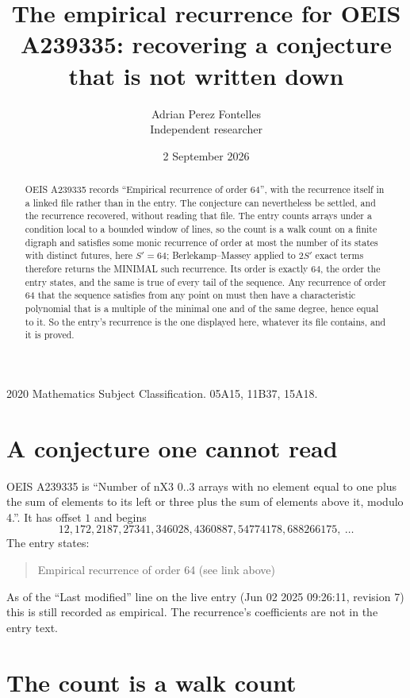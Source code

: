 \documentclass[11pt,a4paper]{article}
\title{The empirical recurrence for OEIS A239335: recovering a conjecture that is not written down}
\author{Adrian Perez Fontelles\\ \small Independent researcher}
\date{2 September 2026}
\theoremstyle{plain}
\theoremstyle{definition}
\begin{document}
\maketitle

\begin{abstract}
OEIS A239335 records ``Empirical recurrence of order $64$'', with the recurrence itself in a
linked file rather than in the entry. The conjecture can nevertheless be settled, and the
recurrence recovered, without reading that file. The entry counts arrays under a condition
local to a bounded window of lines, so the count is a walk count on a finite digraph and
satisfies some monic recurrence of order at most the number of its states with distinct
futures, here $S'=64$; Berlekamp--Massey applied to $2S'$ exact
terms therefore returns the MINIMAL such recurrence. Its order is exactly $64$, the order
the entry states, and the same is true of every tail of the sequence. Any recurrence of order
$64$ that the sequence satisfies from any point on must then have a characteristic
polynomial that is a multiple of the minimal one and of the same degree, hence equal to it. So
the entry's recurrence is the one displayed here, whatever its file contains, and it is
proved.
\end{abstract}

\noindent\small 2020 Mathematics Subject Classification. 05A15, 11B37, 15A18.\normalsize

\section{A conjecture one cannot read}

OEIS A239335 is ``Number of nX3 0..3 arrays with no element equal to one plus the sum of elements to its left or three plus the sum of elements above it, modulo 4.''. It has offset $1$ and begins
\[
12, 172, 2187, 27341, 346028, 4360887, 54774178, 688266175,\ \dots
\]
The entry states:
\begin{quote}
Empirical recurrence of order 64 (see link above)
\end{quote}
As of the ``Last modified'' line on the live entry (Jun 02 2025 09:26:11, revision 7) this is still
recorded as empirical. The recurrence's coefficients are not in the entry text.

\section{The count is a walk count}
\end{document}
